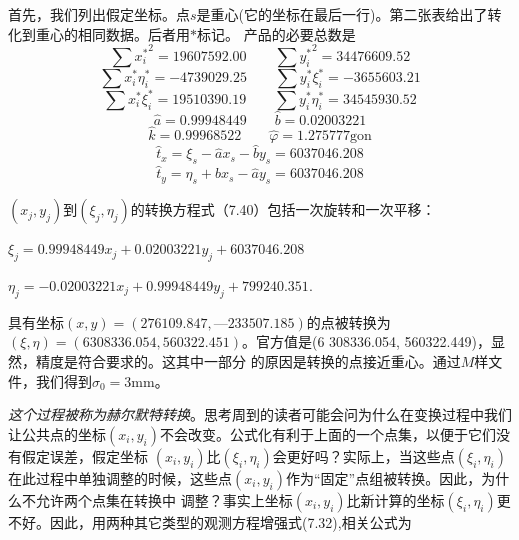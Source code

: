 \par
首先，我们列出假定坐标。点$s$是重心(它的坐标在最后一行)。第二张表给出了转化到重心的相同数据。后者用$\ast$标记。
产品的必要总数是
\begin{equation*}
	\sum{{x_{i}^\ast}}^{2} = 19 607 592.00 \qquad \sum{{y_{i}^\ast}}^{2} = 34476 609.52
\end{equation*}
\begin{equation*}
	\sum x_{i}^{\ast}\eta_{i}^{\ast} = -4739 029.25 \qquad \sum y_{i}^{\ast}\xi_{i}^{\ast} =  -3 655 603.21
\end{equation*}
\begin{equation*}
	\sum x_{i}^{\ast}\xi_{i}^{\ast} = 19 510390.19 \qquad \sum y_{i}^{\ast}\eta_{i}^{\ast} = 34 545 930.52
\end{equation*}
\begin{equation*}
	\hat{a} = 0.99948449 \qquad \hat{b} = 0.020032 21
\end{equation*}
\begin{equation*}
	\hat{k} = 0.999 685 22 \qquad \hat{\varphi} = 1.275 777 \text{gon}
\end{equation*}
\begin{equation*}
	\hat{t}_x = \xi_s - \hat{a}x_s - \hat{b}y_s = 6 037 046.208
\end{equation*}
\begin{equation*}
	\hat{t}_y = \eta_s + \hat{b}x_s - \hat{a}y_s = 6 037 046.208
\end{equation*}
\par
$(x_j, y_j)$到$(\xi_j, \eta_j)$的转换方程式（7.40）包括一次旋转和一次平移：
\par $\xi_j = 0.999 484 49 x_j + 0.020 032 21 y_j + 6 037 046.208$
\par $\eta_j = -0.020 032 21 x_j + 0.999 484 49 y_j + 799 240.351.$
\par\noindent
具有坐标$(x, y) = (276 109.847, — 233 507.185)$的点被转换为$(\xi, \eta) =(6308 336.054, 560322.451)$。官方值是(6 308336.054, 560322.449)，显然，精度是符合要求的。这其中一部分
的原因是转换的点接近重心。通过$M$样文件，我们得到$\hat{\sigma}_0 = 3$mm。
\par
\emph{这个过程被称为赫尔默特转换}。思考周到的读者可能会问为什么在变换过程中我们让公共点的坐标$(x_i, y_i)$不会改变。公式化有利于上面的一个点集，以便于它们没有假定误差，假定坐标
$(x_i, y_i)$比$(\xi_i, \eta_i)$会更好吗？实际上，当这些点$(\xi_i, \eta_i)$在此过程中单独调整的时候，这些点$(x_i, y_i)$作为“固定”点组被转换。因此，为什么不允许两个点集在转换中
调整？事实上坐标$(x_i, y_i)$比新计算的坐标$(\xi_i, \eta_i)$更不好。因此，用两种其它类型的观测方程增强式(7.32),相关公式为
